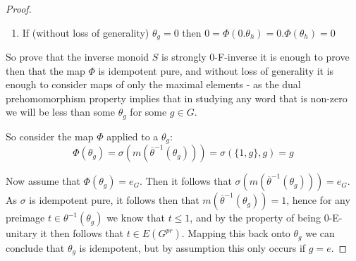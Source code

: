 \documentclass[11pt]{amsart}
\theoremstyle{plain}
\theoremstyle{definition}%
\theoremstyle{remark}%
\begin{document}
\begin{proof}
\begin{enumerate}
\item If (without loss of generality) $\theta_{g}=0$ then $0=\Phi(0.\theta_{h})= 0.\Phi(\theta_{h})=0$
\end{enumerate}
So prove that the inverse monoid $S$ is strongly 0-F-inverse it is enough to prove then that the map $\Phi$ is idempotent pure, and without loss of generality it is enough to consider maps of only the maximal elements - as the dual prehomomorphism property implies that in studying any word that is non-zero we will be less than some $\theta_{g}$ for some $g \in G$.

So consider the map $\Phi$ applied to a $\theta_{g}$:
\begin{equation*}
\Phi(\theta_{g})=\sigma ( m(\overline{\theta}^{-1}(\theta_{g}))) = \sigma ( \lbrace 1,g \rbrace, g)= g
\end{equation*}

Now assume that $\Phi(\theta_{g}) = e_{G}$. Then it follows that $\sigma (m (\overline{\theta}^{-1}(\theta_{g})))=e_{G}$. As $\sigma$ is idempotent pure, it follows then that $m(\overline{\theta}^{-1}(\theta_{g}))=1$, hence for any preimage $t\in \theta^{-1}(\theta_{g})$ we know that $t \leq 1$, and by the property of being 0-E-unitary it then follows that $t \in E(G^{pr})$. Mapping this back onto $\theta_{g}$ we can conclude that $\theta_{g}$ is idempotent, but by assumption this only occurs if $g = e$.\end{proof}
\end{document}
